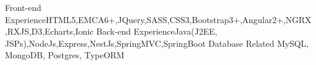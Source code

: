 
\begin{cvskills}
  \cvskill
  {Front-end Experience}{HTML5,EMCA6+,JQuery,SASS,CSS3,Bootstrap3+,Angular2+,NGRX,RXJS,D3,Echarts,Ionic}
  \cvskill
  {Back-end Experience}{Java(J2EE, JSPs),NodeJs,Express,NestJs,SpringMVC,SpringBoot}
  \cvskill
  {Database Related}{ MySQL, MongoDB, Postgres, TypeORM}
\end{cvskills}